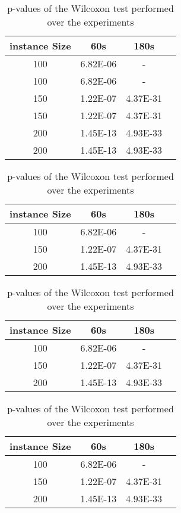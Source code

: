 \begin{table}[H]
\caption{p-values of the Wilcoxon test performed over the experiments}
\label{tab:wilcoxon}
\begin{tabular}{c ccc}
\toprule
instance Size & 60s & 180s \\
\midrule
100 & 6.82E-06 & - \\
100 & 6.82E-06 & - \\
150 & 1.22E-07 & 4.37E-31 \\
150 & 1.22E-07 & 4.37E-31 \\
200 & 1.45E-13 & 4.93E-33 \\
200 & 1.45E-13 & 4.93E-33 \\
\bottomrule
\end{tabular}
\end{table}
\begin{table}[H]
\caption{p-values of the Wilcoxon test performed over the experiments}
\label{tab:wilcoxon}
\begin{tabular}{c ccc}
\toprule
instance Size & 60s & 180s \\
\midrule
100 & 6.82E-06 & - \\
150 & 1.22E-07 & 4.37E-31 \\
200 & 1.45E-13 & 4.93E-33 \\
\bottomrule
\end{tabular}
\end{table}
\begin{table}[H]
\caption{p-values of the Wilcoxon test performed over the experiments}
\label{tab:wilcoxon}
\begin{tabular}{c ccc}
\toprule
instance Size & 60s & 180s \\
\midrule
100 & 6.82E-06 & - \\
150 & 1.22E-07 & 4.37E-31 \\
200 & 1.45E-13 & 4.93E-33 \\
\bottomrule
\end{tabular}
\end{table}
\begin{table}[H]
\caption{p-values of the Wilcoxon test performed over the experiments}
\label{tab:wilcoxon}
\begin{tabular}{c ccc}
\toprule
instance Size & 60s & 180s \\
\midrule
100 & 6.82E-06 & - \\
150 & 1.22E-07 & 4.37E-31 \\
200 & 1.45E-13 & 4.93E-33 \\
\bottomrule
\end{tabular}
\end{table}
